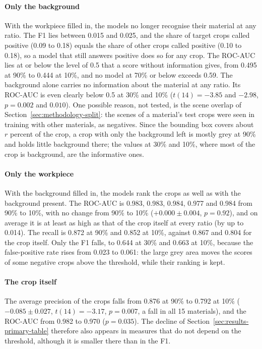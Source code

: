 \paragraph{Only the background}
With the workpiece filled in, the models no longer recognise their material at any
ratio. The F1 lies between 0.015 and 0.025, and the share of target crops called
positive (0.09 to 0.18) equals the share of other crops called positive (0.10 to 0.18),
so a model that still answers positive does so for any crop. The ROC-AUC lies at or
below the level of 0.5 that a score without information gives, from 0.495 at 90\% to
0.444 at 10\%, and no model at 70\% or below exceeds 0.59. The background alone
carries no information about the material at any ratio. Its ROC-AUC is even clearly
below 0.5 at 30\% and 10\% ($t(14) = -3.85$ and $-2.98$, $p = 0.002$ and $0.010$). One
possible reason, not tested, is the scene overlap of Section~\ref{sec:methodology-split}:
the scenes of a material's test crops were seen in training with other materials, as
negatives. Since the bounding box covers about $r$ percent of the crop, a crop with only
the background left is mostly grey at 90\% and holds little background there; the values
at 30\% and 10\%, where most of the crop is background, are the informative ones.

\paragraph{Only the workpiece}
With the background filled in, the models rank the crops as well as with the background
present. The ROC-AUC is 0.983, 0.983, 0.984, 0.977 and 0.984 from 90\% to 10\%, with no
change from 90\% to 10\% ($+0.000 \pm 0.004$, $p = 0.92$), and on average it is at least
as high as that of the crop itself at every ratio (by up to 0.014). The recall is 0.872 at 90\% and 0.852 at 10\%, against 0.867 and 0.804
for the crop itself. Only the F1 falls, to 0.644 at 30\% and 0.663 at 10\%, because the
false-positive rate rises from 0.023 to 0.061: the large grey area moves the scores of
some negative crops above the threshold, while their ranking is kept.

\paragraph{The crop itself}
The average precision of the crops falls from 0.876 at 90\% to 0.792 at 10\%
($-0.085 \pm 0.027$, $t(14) = -3.17$, $p = 0.007$, a fall in all 15 materials), and the
ROC-AUC from 0.982 to 0.970 ($p = 0.035$). The decline of
Section~\ref{sec:results-primary-table} therefore also appears in measures that do not
depend on the threshold, although it is smaller there than in the F1.

